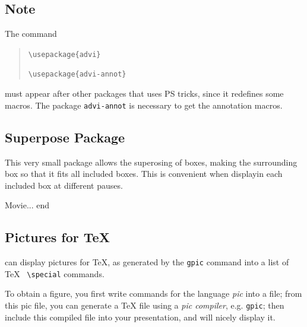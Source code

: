 \documentclass[12pt]{article}
\begin{document}
\subsection*{Note}

The command 
\begin{quote}

\verb"\usepackage{advi}"

\verb"\usepackage{advi-annot}"

\end{quote}
must appear after other packages that uses PS tricks, since it redefines
some macros.  The package \verb"advi-annot" is necessary to get
the annotation macros.

\newpage

\subsection*{Superpose Package}

This very small package allows the superosing of boxes, making the
surrounding box so that it fits all included boxes. This is convenient
when displayin each included box at different pauses.

Movie...
end
\adviwait{}
\adviwait{}

\newpage

\subsection*{Pictures for \TeX}

{\ActiveDVI} can display pictures for \TeX, as generated by
the \verb"gpic" command into a list of \TeX~ \verb"\special" commands.

\bigskip

To obtain a figure, you first write commands for the language
{\em pic} into a file; from this pic file, you can generate a \TeX
file using a {\em pic compiler}, e.g. \verb"gpic"; then include this
compiled file into your presentation, and {\ActiveDVI} will nicely display it.
\end{document}
